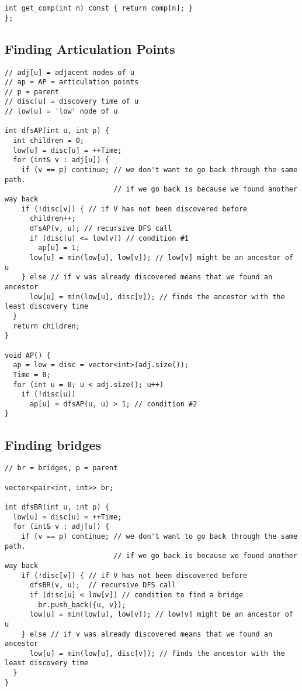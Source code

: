 \documentclass[10pt]{article}
\begin{document}
\begin{multicols*}{2}
\begin{lstlisting}[style=compactcpp]
	int get_comp(int n) const { return comp[n]; }
};
\end{lstlisting}

\subsection{Finding Articulation Points}

\begin{lstlisting}[style=compactcpp]
// adj[u] = adjacent nodes of u
// ap = AP = articulation points
// p = parent
// disc[u] = discovery time of u
// low[u] = 'low' node of u

int dfsAP(int u, int p) {
  int children = 0;
  low[u] = disc[u] = ++Time;
  for (int& v : adj[u]) {
    if (v == p) continue; // we don't want to go back through the same path.
                          // if we go back is because we found another way back
    if (!disc[v]) { // if V has not been discovered before
      children++;
      dfsAP(v, u); // recursive DFS call
      if (disc[u] <= low[v]) // condition #1
        ap[u] = 1;
      low[u] = min(low[u], low[v]); // low[v] might be an ancestor of u
    } else // if v was already discovered means that we found an ancestor
      low[u] = min(low[u], disc[v]); // finds the ancestor with the least discovery time
  }
  return children;
}

void AP() {
  ap = low = disc = vector<int>(adj.size());
  Time = 0;
  for (int u = 0; u < adj.size(); u++)
    if (!disc[u])
      ap[u] = dfsAP(u, u) > 1; // condition #2
}
\end{lstlisting}

\subsection{Finding bridges}

\begin{lstlisting}[style=compactcpp]
// br = bridges, p = parent

vector<pair<int, int>> br;

int dfsBR(int u, int p) {
  low[u] = disc[u] = ++Time;
  for (int& v : adj[u]) {
    if (v == p) continue; // we don't want to go back through the same path.
                          // if we go back is because we found another way back
    if (!disc[v]) { // if V has not been discovered before
      dfsBR(v, u);  // recursive DFS call
      if (disc[u] < low[v]) // condition to find a bridge
        br.push_back({u, v});
      low[u] = min(low[u], low[v]); // low[v] might be an ancestor of u
    } else // if v was already discovered means that we found an ancestor
      low[u] = min(low[u], disc[v]); // finds the ancestor with the least discovery time
  }
}


\end{lstlisting}
\end{multicols*}
\end{document}

